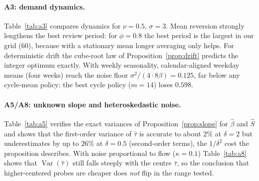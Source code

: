 \documentclass[11pt]{article}
\theoremstyle{definition}
\theoremstyle{remark}
\newcommand{\Var}{\operatorname{Var}}
\begin{document}
\begin{expsec}
\paragraph{A3: demand dynamics.} Table~\ref{tab:a3} compares dynamics for $\nu=0.5$, $\sigma=3$. Mean reversion strongly lengthens the best review period: for $\phi=0.8$ the best period is the largest in our grid ($60$), because with a stationary mean longer averaging only helps. For deterministic drift the cube-root law of Proposition~\ref{prop:drift} predicts the integer optimum exactly. With weekly seasonality, calendar-aligned weekday means (four weeks) reach the noise floor $\sigma^2/(4\cdot8\beta)=0.125$, far below any cycle-mean policy: the best cycle policy ($m=14$) loses $0.598$.
\begin{table}[t]\centering\small
\begin{minipage}[t]{.48\linewidth}\centering\end{minipage}\hfill
\begin{minipage}[t]{.48\linewidth}\centering\end{minipage}\vspace{6pt}

\caption{A3. Left: AR(1) demand. Right: weekly seasonality ($A=3$, $\sigma=2$). Bottom: deterministic drift ($\sigma=2$), Proposition~\ref{prop:drift}.}\label{tab:a3}\end{table}

\paragraph{A5/A8: unknown slope and heteroskedastic noise.} Table~\ref{tab:a5} verifies the exact variances of Proposition~\ref{prop:slope} for $\hat\beta$ and $\hat S$ and shows that the first-order variance of $\hat\tau$ is accurate to about $2\%$ at $\delta=2$ but underestimates by up to $26\%$ at $\delta=0.5$ (second-order terms), the $1/\delta^2$ cost the proposition describes. With noise proportional to flow ($\kappa=0.1$) Table~\ref{tab:a8} shows that $\Var(\hat\tau)$ still falls steeply with the centre $\bar\tau$, so the conclusion that higher-centered probes are cheaper does \emph{not} flip in the range tested.
\begin{table}[t]\centering\small
\caption{A5. Two-level probing, $S=16$, $\sigma=1$, $n=20$, $4\times10^5$ replications. The first-order formula for $\Var(\hat\tau)$ is a delta-method approximation.}\label{tab:a5}\end{table}
\begin{table}[t]\centering\small
\caption{A8. Noise standard deviation $\kappa\times$flow ($\kappa=0.1$), $\delta=1$, $n=20$. The delta method with heteroskedastic covariance tracks simulation; the constant-noise formula does not.}\label{tab:a8}\end{table}


\end{expsec}
\end{document}
